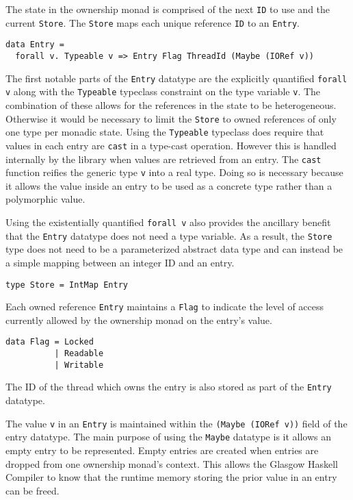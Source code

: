 \documentclass[onehalf,11pt]{beavtex}
\begin{document}
The state in the ownership monad is comprised of the next \texttt{ID}
to use and the current \texttt{Store}.  The \texttt{Store} maps each unique
reference \texttt{ID} to an \texttt{Entry}.

\begin{verbatim}
data Entry =
  forall v. Typeable v => Entry Flag ThreadId (Maybe (IORef v))
\end{verbatim}

The first notable parts of the \texttt{Entry} datatype are the explicitly
quantified \texttt{forall v} along with the \texttt{Typeable} typeclass
constraint on the type variable \texttt{v}.
The combination of these allows for the references in the state to be
heterogeneous.
Otherwise it would be necessary to limit the \texttt{Store} to owned
references of only one type per monadic state. %
Using the \texttt{Typeable} typeclass does require that values in each entry are
\texttt{cast} in a type-cast operation.  However this is handled internally
by the library when values are retrieved from an entry.
The \texttt{cast} function reifies the generic type \texttt{v} into a real
type.
Doing so is necessary because it allows the value inside an entry to be used
as a concrete type rather than a polymorphic value.

Using the existentially quantified \texttt{forall v} also provides the
ancillary benefit that the \texttt{Entry} datatype does not need a type
variable.
As a result, the \texttt{Store} type does not need to be a parameterized abstract
data type and can instead be a simple mapping between an integer ID and an entry.

\begin{verbatim}
type Store = IntMap Entry
\end{verbatim}

Each owned reference \texttt{Entry} maintains a \texttt{Flag} to indicate the
level of access currently allowed by the ownership monad on the entry's value.

\begin{verbatim}
data Flag = Locked
          | Readable
          | Writable
\end{verbatim}

The ID of the thread which owns the entry is also stored as part of the
\texttt{Entry} datatype. 

The value \texttt{v} in an \texttt{Entry} is maintained within the
\texttt{(Maybe (IORef v))} field of the entry datatype.
The main purpose of using the \texttt{Maybe} datatype is it allows an empty entry
to be represented.
Empty entries are created when entries are dropped from one ownership monad's
context.  This allows the Glasgow Haskell Compiler to know that
the runtime memory storing the prior value in an entry can be freed.
\end{document}
